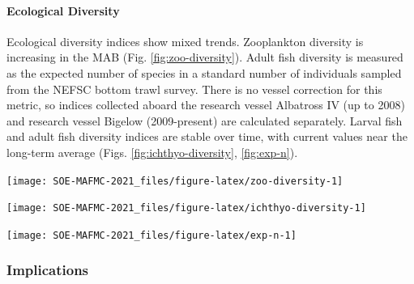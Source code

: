 \documentclass[
  10pt,
]{article}
\let\origfigure\figure
\let\endorigfigure\endfigure
\renewenvironment{figure}[1][2] {
    \expandafter\origfigure\expandafter[H]
} {
    \endorigfigure
}
\begin{document}
\hypertarget{ecological-diversity}{%
\paragraph{Ecological Diversity}\label{ecological-diversity}}

Ecological diversity indices show mixed trends. Zooplankton diversity is
increasing in the MAB (Fig. \ref{fig:zoo-diversity}). Adult fish
diversity is measured as the expected number of species in a standard
number of individuals sampled from the NEFSC bottom trawl survey. There
is no vessel correction for this metric, so indices collected aboard the
research vessel Albatross IV (up to 2008) and research vessel Bigelow
(2009-present) are calculated separately. Larval fish and adult fish
diversity indices are stable over time, with current values near the
long-term average (Figs. \ref{fig:ichthyo-diversity}, \ref{fig:exp-n}).

\begin{figure}

{\centering \texttt{[image: SOE-MAFMC-2021\_files/figure-latex/zoo-diversity-1]} 

}

\caption{Zooplankton diversity in the Mid-Atlantic Bight, based on Shannon diversity index.}\label{fig:zoo-diversity}
\end{figure}

\begin{figure}

{\centering \texttt{[image: SOE-MAFMC-2021\_files/figure-latex/ichthyo-diversity-1]} 

}

\caption{Larval fish diversity in the Mid-Atlantic Bight, based on Shannon diversity index.}\label{fig:ichthyo-diversity}
\end{figure}

\begin{figure}

{\centering \texttt{[image: SOE-MAFMC-2021\_files/figure-latex/exp-n-1]} 

}

\caption{Adult fish diversity the Mid-Atlantic Bight, based on expected number of species.}\label{fig:exp-n}
\end{figure}

\hypertarget{implications-3}{%
\subsubsection{Implications}\label{implications-3}}
\end{document}
